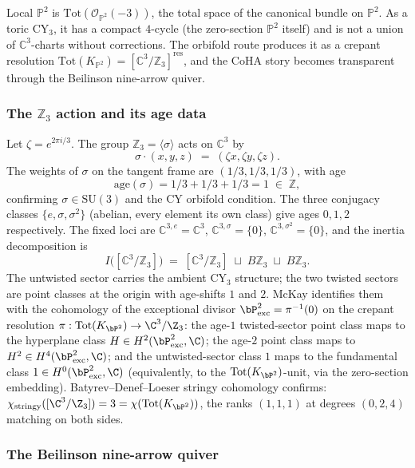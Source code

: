 Local $\mathbb{P}^2$ is $\mathrm{Tot}(\mathcal{O}_{\mathbb{P}^2}(-3))$, the total space of the canonical bundle on $\mathbb{P}^2$. As a toric CY$_3$, it has a compact $4$-cycle (the zero-section $\mathbb{P}^2$ itself) and is not a union of $\mathbb{C}^3$-charts without corrections. The orbifold route produces it as a crepant resolution $\mathrm{Tot}(K_{\mathbb{P}^2}) = [\mathbb{C}^3/\mathbb{Z}_3]^{\mathrm{res}}$, and the CoHA story becomes transparent through the Beilinson nine-arrow quiver.

\subsubsection{The \texorpdfstring{$\mathbb{Z}_3$}{Z3} action and its age data}
\label{subsec:Z3-action}

Let $\zeta = e^{2\pi i/3}$. The group $\mathbb{Z}_3 = \langle \sigma \rangle$ acts on $\mathbb{C}^3$ by
\[
\sigma \cdot (x, y, z) \;=\; (\zeta x, \zeta y, \zeta z).
\]
The weights of $\sigma$ on the tangent frame are $(1/3, 1/3, 1/3)$, with age
\[
\mathrm{age}(\sigma) = 1/3 + 1/3 + 1/3 = 1 \;\in\; \mathbb{Z},
\]
confirming $\sigma \in \mathrm{SU}(3)$ and the CY orbifold condition. The three conjugacy classes $\{e, \sigma, \sigma^2\}$ (abelian, every element its own class) give ages $0, 1, 2$ respectively. The fixed loci are $\mathbb{C}^{3,e} = \mathbb{C}^3$, $\mathbb{C}^{3,\sigma} = \{0\}$, $\mathbb{C}^{3,\sigma^2} = \{0\}$, and the inertia decomposition is
\[
I\bigl([\mathbb{C}^3/\mathbb{Z}_3]\bigr) \;=\; [\mathbb{C}^3/\mathbb{Z}_3] \;\sqcup\; B\mathbb{Z}_3 \;\sqcup\; B\mathbb{Z}_3.
\]
The untwisted sector carries the ambient CY$_3$ structure; the two twisted sectors are point classes at the origin with age-shifts $1$ and $2$. McKay identifies them with the cohomology of the exceptional divisor $\bP^2_{\mathrm{exc}} = \pi^{-1}(0)$ on the crepant resolution $\pi: \mathrm{Tot}(K_{\bP^2}) \to \C^3/\Z_3$: the age-$1$ twisted-sector point class maps to the hyperplane class $H \in H^2(\bP^2_{\mathrm{exc}}, \C)$; the age-$2$ point class maps to $H^2 \in H^4(\bP^2_{\mathrm{exc}}, \C)$; and the untwisted-sector class $1$ maps to the fundamental class $1 \in H^0(\bP^2_{\mathrm{exc}}, \C)$ (equivalently, to the $\mathrm{Tot}(K_{\bP^2})$-unit, via the zero-section embedding). Batyrev--Denef--Loeser stringy cohomology confirms: $\chi_{\mathrm{stringy}}([\C^3/\Z_3]) = 3 = \chi(\mathrm{Tot}(K_{\bP^2}))$, the ranks $(1, 1, 1)$ at degrees $(0, 2, 4)$ matching on both sides.

\subsubsection{The Beilinson nine-arrow quiver}
\label{subsec:beilinson-quiver}

